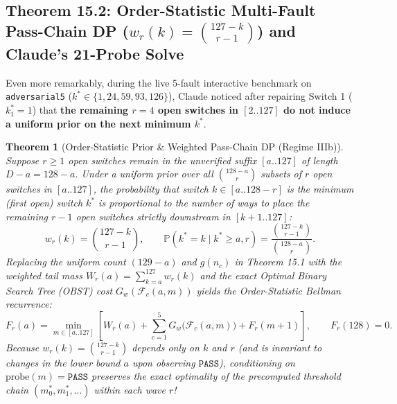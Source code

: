 \documentclass[11pt,a4paper]{article}
\newtheorem{theorem}{Theorem}[section]
\theoremstyle{definition}
\theoremstyle{remark}
\begin{document}
\subsection{Theorem 15.2: Order-Statistic Multi-Fault Pass-Chain DP ($w_r(k) = \binom{127-k}{r-1}$) and Claude's 21-Probe Solve}

Even more remarkably, during the live 5-fault interactive benchmark on \texttt{adversarial5} ($k^* \in \{1, 24, 59, 93, 126\}$), Claude noticed after repairing Switch 1 ($k^*_1 = 1$) that \textbf{the remaining $r = 4$ open switches in $[2..127]$ do not induce a uniform prior on the next minimum $k^*$}.

\begin{theorem}[Order-Statistic Prior \& Weighted Pass-Chain DP (Regime IIIb)]
Suppose $r \ge 1$ open switches remain in the unverified suffix $[a..127]$ of length $D - a = 128 - a$. Under a uniform prior over all $\binom{128-a}{r}$ subsets of $r$ open switches in $[a..127]$, the probability that switch $k \in [a..128-r]$ is the \emph{minimum} (first open) switch $k^*$ is proportional to the number of ways to place the remaining $r - 1$ open switches strictly downstream in $[k+1..127]$:
\begin{equation}
    w_r(k) = \binom{127 - k}{r - 1}, \qquad \mathbb{P}(k^* = k \mid k^* \ge a, r) = \frac{\binom{127 - k}{r - 1}}{\binom{128 - a}{r}}.
\end{equation}
Replacing the uniform count $(129 - a)$ and $g(n_c)$ in Theorem 15.1 with the weighted tail mass $W_r(a) = \sum_{k=a}^{127} w_r(k)$ and the exact Optimal Binary Search Tree (OBST) cost $G_w(\mathcal{F}_c(a, m))$ yields the Order-Statistic Bellman recurrence:
\begin{equation}
    F_r(a) = \min_{m \in [a..127]} \left[ W_r(a) + \sum_{c=1}^{5} G_w\big(\mathcal{F}_c(a, m)\big) + F_r(m + 1) \right], \qquad F_r(128) = 0.
\end{equation}
Because $w_r(k) = \binom{127-k}{r-1}$ depends only on $k$ and $r$ (and is invariant to changes in the lower bound $a$ upon observing $\texttt{PASS}$), conditioning on $\text{probe}(m) = \texttt{PASS}$ preserves the exact optimality of the precomputed threshold chain $(m_0^*, m_1^*, \dots)$ within each wave $r$!
\end{theorem}
\end{document}
